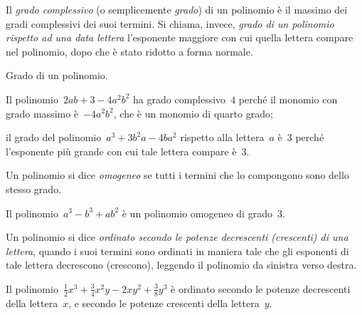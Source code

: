 \begin{definizione}
Il \emph{grado complessivo} (o semplicemente \emph{grado}) di un polinomio 
è il massimo dei gradi complessivi dei suoi
termini. Si chiama, invece, \emph{grado di un polinomio rispetto ad una 
data lettera} l'esponente maggiore con
cui quella lettera compare nel polinomio, dopo che è stato ridotto a forma 
normale.
\end{definizione}

\begin{exrig}
\begin{esempio} Grado di un polinomio.
\begin{itemize*}
\item Il polinomio~\(2ab+3-4a^2b^2\) ha grado complessivo~\(4\) perché il 
monomio con grado massimo è~\(-4a^2b^2 \), che è un monomio di quarto grado;
\item il grado del polinomio~\(a^3+3b^2a-4ba^2\) rispetto alla lettera~\(a\) 
è~\(3\) perché l'esponente più grande con cui tale lettera compare è~\(3\).
\end{itemize*}
\end{esempio}
\end{exrig}


\begin{definizione}
Un polinomio si dice \emph{omogeneo} se tutti i termini che lo compongono 
sono dello stesso grado.
\end{definizione}

\begin{exrig}
\begin{esempio}
Il polinomio~\(a^3-b^3+ab^2\) è un polinomio omogeneo di grado~\(3\).
\end{esempio}
\end{exrig}


\begin{definizione}
Un polinomio si dice \emph{ordinato secondo le potenze decrescenti 
(crescenti) di una lettera}, quando i suoi
termini sono ordinati in maniera tale che gli esponenti di tale lettera 
decrescono (crescono), leggendo il
polinomio da sinistra verso destra.
\end{definizione}

\begin{exrig}
\begin{esempio}
Il polinomio~\(\frac{1}{2}x^3+\frac{3}{4}x^2y-2xy^2+\frac{3}{8}y^3\) è 
ordinato secondo le potenze decrescenti della lettera~\(x\), e secondo le 
potenze crescenti della lettera~\(y\).
\end{esempio}
\end{exrig}

